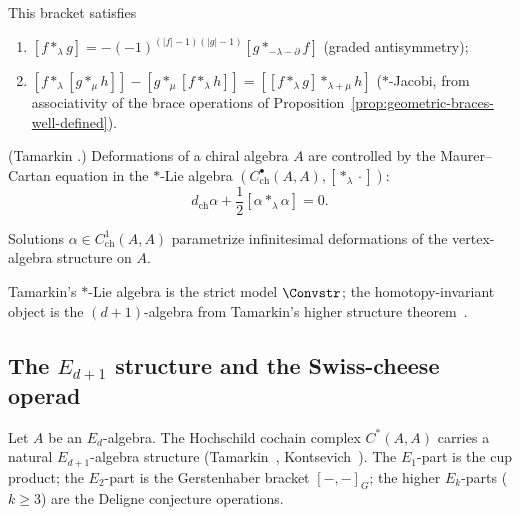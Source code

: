 This bracket satisfies
\begin{enumerate}[label=(\roman*)]
\item $[f *_\lambda g] = -(-1)^{(|f|-1)(|g|-1)} [g *_{-\lambda-\partial} f]$ (graded antisymmetry);
\item $[f *_\lambda [g *_\mu h]] - [g *_\mu [f *_\lambda h]] = [[f *_\lambda g] *_{\lambda + \mu} h]$ ($*$-Jacobi, from associativity of the brace operations of Proposition~\ref{prop:geometric-braces-well-defined}).
\end{enumerate}

\begin{theorem}
\label{thm:Tamarkin_deformation}
(Tamarkin \cite{Tam02}.) Deformations of a chiral algebra $A$ are controlled by the Maurer--Cartan equation in the $*$-Lie algebra $(C^\bullet_{\text{ch}}(A, A), [*_\lambda \cdot])$:
\begin{equation}
d_{\text{ch}} \alpha + \frac{1}{2} [\alpha *_\lambda \alpha] = 0.
\end{equation}

Solutions $\alpha \in C^1_{\text{ch}}(A, A)$ parametrize infinitesimal deformations of the vertex-algebra structure on $A$.
\end{theorem}

\begin{remark}
\label{rem:tamarkin-two-level}
Tamarkin's $*$-Lie algebra is the strict model $\Convstr$;
the homotopy-invariant object is the $(d{+}1)$-algebra from
Tamarkin's higher structure theorem~\cite{Tamarkin00}.
\end{remark}

\subsection{\texorpdfstring{The $E_{d+1}$ structure and the Swiss-cheese operad}{The E(d+1) structure and the Swiss-cheese operad}}
\label{subsec:tamarkin-swiss-cheese}

\begin{theorem}
\label{thm:tamarkin-higher-structure}
Let $A$ be an $E_d$-algebra. The Hochschild cochain complex
$C^*(A,A)$ carries a natural $E_{d+1}$-algebra structure
\textup{(}Tamarkin~\textup{\cite{Tamarkin00}},
Kontsevich~\textup{\cite{Kon03})}. The $E_1$-part is the
cup product; the $E_2$-part is the Gerstenhaber bracket
$[-,-]_G$; the higher $E_k$-parts ($k\ge 3$) are the
Deligne conjecture operations.
\end{theorem}

